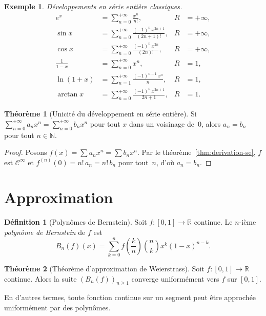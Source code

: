 \documentclass[12pt,a4paper,openany]{book}
\theoremstyle{definition}
\newtheorem{definition}{Définition}[chapter]
\newtheorem{theoreme}{Théorème}[chapter]
\newtheorem{exemple}{Exemple}[chapter]
\newcommand{\N}{\mathbb{N}}
\newcommand{\R}{\mathbb{R}}
\begin{document}
\begin{exemple}\label{ex:series-entieres-classiques}
  \emph{Développements en série entière classiques.}
  \begin{align*}
    e^x &= \sum_{n=0}^{+\infty}\frac{x^n}{n!}, & R &= +\infty, \\
    \sin x &= \sum_{n=0}^{+\infty}\frac{(-1)^n\,x^{2n+1}}{(2n+1)!}, & R &= +\infty, \\
    \cos x &= \sum_{n=0}^{+\infty}\frac{(-1)^n\,x^{2n}}{(2n)!}, & R &= +\infty, \\
    \frac{1}{1-x} &= \sum_{n=0}^{+\infty} x^n, & R &= 1, \\
    \ln(1+x) &= \sum_{n=1}^{+\infty}\frac{(-1)^{n-1}\,x^n}{n}, & R &= 1, \\
    \arctan x &= \sum_{n=0}^{+\infty}\frac{(-1)^n\,x^{2n+1}}{2n+1}, & R &= 1.
  \end{align*}
\end{exemple}

\begin{theoreme}[Unicité du développement en série entière]\label{thm:unicite-dse}
  Si $\sum_{n=0}^{+\infty} a_n x^n = \sum_{n=0}^{+\infty} b_n x^n$ pour tout $x$ dans un voisinage de~$0$, alors $a_n = b_n$ pour tout $n \in \N$.
\end{theoreme}

\begin{proof}
  Posons $f(x) = \sum a_n x^n = \sum b_n x^n$. Par le théorème~\ref{thm:derivation-se}, $f$ est $\mathcal{C}^\infty$ et $f^{(n)}(0) = n!\,a_n = n!\,b_n$ pour tout~$n$, d'où $a_n = b_n$.
\end{proof}

\section{Approximation}
\label{sec:approximation}

\begin{definition}[Polynômes de Bernstein]\label{def:bernstein}
  Soit $f \colon [0,1] \to \R$ continue. Le $n$-ième \emph{polynôme de Bernstein} de $f$ est
  \[
    B_n(f)(x) = \sum_{k=0}^{n} f\!\left(\frac{k}{n}\right) \binom{n}{k} x^k (1-x)^{n-k}.
  \]
\end{definition}

\begin{theoreme}[Théorème d'approximation de Weierstrass]\label{thm:weierstrass-approximation}
  Soit $f \colon [0,1] \to \R$ continue. Alors la suite $(B_n(f))_{n \geqslant 1}$ converge uniformément vers $f$ sur $[0,1]$.

  En d'autres termes, toute fonction continue sur un segment peut être approchée uniformément par des polynômes.
\end{theoreme}
\end{document}
